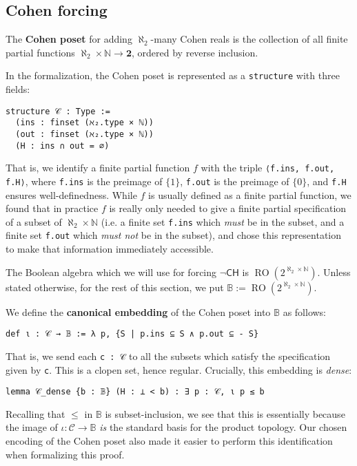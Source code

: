 \documentclass[sigplan,10pt,review, anonymous]{acmart}
\newcommand{\B}{\mathbb{B}}
\newcommand{\lil}{\lstinline}
\theoremstyle{definition}
\begin{document}
\subsection{Cohen forcing}
\begin{definition}
  The \textbf{Cohen poset} for adding $\aleph_2$-many Cohen reals is the collection of all finite partial functions $\aleph_2 \times \mathbb{N} \to \mathbf{2}$, ordered by reverse inclusion.
\end{definition}

In the formalization, the Cohen poset is represented as a \lstinline{structure} with three fields:
\begin{lstlisting}
structure 𝒞 : Type :=
  (ins : finset (ℵ₂.type × ℕ))
  (out : finset (ℵ₂.type × ℕ))
  (H : ins ∩ out = ∅)
\end{lstlisting}

That is, we identify a finite partial function $f$ with the triple \lil{⟨f.ins, f.out, f.H⟩}, where \lil{f.ins} is the preimage of $\{1\}$, \lil{f.out} is the preimage of $\{0\}$, and \lil{f.H} ensures well-definedness. While $f$ is usually defined as a finite partial function, we found that in practice $f$ is really only needed to give a finite partial specification of a subset of $\aleph_2 \times \mathbb{N}$ (i.e. a finite set \lil{f.ins} which \emph{must} be in the subset, and a finite set \lil{f.out} which \emph{must not} be in the subset), and chose this representation to make that information immediately accessible.

The Boolean algebra which we will use for forcing $\neg\mathsf{CH}$ is $\operatorname{RO}(2^{\aleph_2 \times \mathbb{N}})$. Unless stated otherwise, for the rest of this section, we put $\B := \operatorname{RO}(2^{\aleph_2 \times \mathbb{N}})$.

\begin{definition}
  We define the \textbf{canonical embedding} of the Cohen poset into $\B$ as follows:
  \begin{lstlisting}
def ι : 𝒞 → 𝔹 := λ p, {S | p.ins ⊆ S ∧ p.out ⊆ - S}
\end{lstlisting}
\end{definition}
That is, we send each \lil{c : 𝒞} to all the subsets which satisfy the specification given by \lil{c}. This is a clopen set, hence regular. Crucially, this embedding is \emph{dense}:
\begin{lstlisting}
lemma 𝒞_dense {b : 𝔹} (H : ⊥ < b) : ∃ p : 𝒞, ι p ≤ b
\end{lstlisting}
Recalling that $\leq$ in $\B$ is subset-inclusion, we see that this is essentially because the image of $\iota : \mathcal{C} \to \B$ \emph{is} the standard basis for the product topology. Our chosen encoding of the Cohen poset also made it easier to perform this identification when formalizing this proof.
\end{document}
